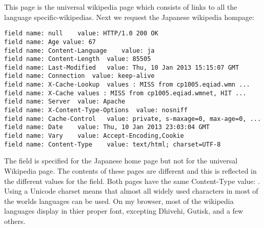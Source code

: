 %
This page is the universal wikipedia page which consists of links to all
the language specific-wikipedias.
Next we request the Japanese wikipedia hompage:
%
\begin{verbatim}
field name: null	value: HTTP/1.0 200 OK 
field name: Age	value: 67
field name: Content-Language	value: ja
field name: Content-Length	value: 85505
field name: Last-Modified	value: Thu, 10 Jan 2013 15:15:07 GMT
field name: Connection	value: keep-alive
field name: X-Cache-Lookup	values : MISS from cp1005.eqiad.wmn ...
field name: X-Cache	values : MISS from cp1005.eqiad.wmnet, HIT ...
field name: Server	value: Apache
field name: X-Content-Type-Options	value: nosniff
field name: Cache-Control	value: private, s-maxage=0, max-age=0, ...
field name: Date	value: Thu, 10 Jan 2013 23:03:04 GMT
field name: Vary	value: Accept-Encoding,Cookie
field name: Content-Type	value: text/html; charset=UTF-8
\end{verbatim}
%
The field  is specified for the Japanese home page
but not for the universal Wikipedia page.  The contents of these pages are different
and this is reflected in the different values for the  field.
Both pages have the same Content-Type value: .
Using a Unicode charset means that almost all widely used characters in most of the
worlds languages can be used.
On my browser, most of the wikipedia languages display in thier proper font, excepting
Dhivehi, Gutisk, and a few others.

